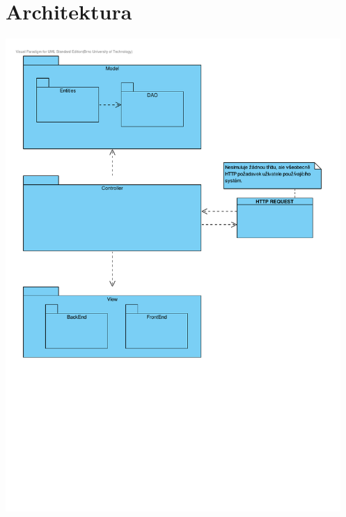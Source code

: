 \documentclass[12pt,a4paper,titlepage,final]{report}
\begin{document}
\chapter{Architektura}
		\begin{center}
			\captionsetup{type=figure}
			\includegraphics[height=18cm]{img/architektura.pdf}
		\end{center}
		
\end{document}
